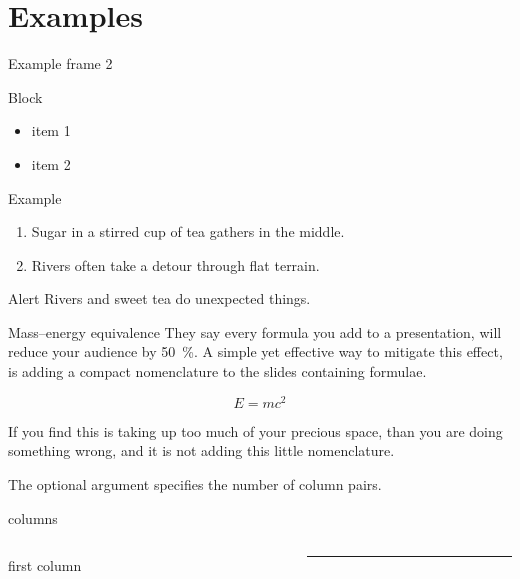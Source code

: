 

\section{Examples}
\begin{frame}{Example frame 2}
  \begin{block}{Block}
    \begin{itemize}
      \item item 1
      \item item 2
    \end{itemize}
  \end{block}

  \begin{exampleblock}{Example}
    \begin{enumerate}
      \item Sugar in a stirred cup of tea gathers in the middle.
      \item Rivers often take a detour through flat terrain.
    \end{enumerate}
  \end{exampleblock}

  \begin{alertblock}{Alert}
     Rivers and sweet tea do unexpected things.\cite{_unimate_2022} 
   \end{alertblock}
\end{frame}

\begin{frame}{Mass--energy equivalence}
	They say every formula you add to a presentation, will reduce your audience by \SI{50}{\percent}. A simple yet effective way to mitigate this effect, is adding a compact nomenclature to the slides containing formulae.
	
	\[E=mc^2\]
	
	If you find this is taking up too much of your precious space, than you are doing something wrong, and it is not adding this little nomenclature.
	
	The optional argument specifies the number of column pairs.
	
\end{frame}

\begin{frame}{columns}
  \begin{columns}[onlytextwidth]
    \begin{column}{.5\textwidth}
      first column
    \end{column}
    \begin{column}{.5\textwidth}
      \textcolor{tudCyan}{\rule{1\columnwidth}{1\columnwidth}}
    \end{column}
  \end{columns}
\end{frame}

